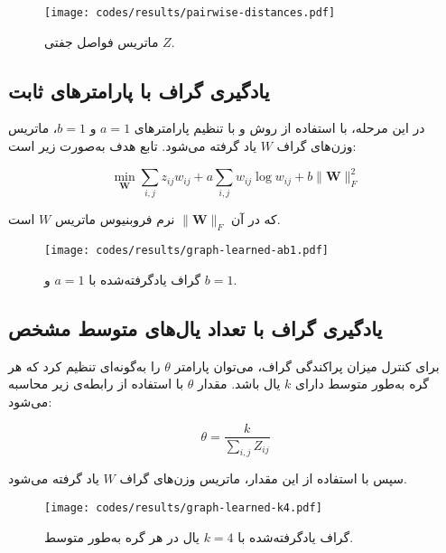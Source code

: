 \documentclass[10pt,twocolumn,a4paper]{article}
\begin{document}
	
	\begin{figure}[H]
		\centering
		\texttt{[image: codes/results/pairwise-distances.pdf]}
		\caption{ماتریس فواصل جفتی \( Z \).}
		\label{fig:pairwise-distances}
	\end{figure}
	
	\subsection{یادگیری گراف با پارامترهای ثابت}
	در این مرحله، با استفاده از روش \cite{Kalofolias2016} و با تنظیم پارامترهای \( a = 1 \) و \( b = 1 \)، ماتریس وزن‌های گراف \( W \) یاد گرفته می‌شود. تابع هدف به‌صورت زیر است:
	
	\[
	\min_{\bm{W}} \sum_{i,j} z_{ij} w_{ij} + a \sum_{i,j} {w}_{ij} \log {w}_{ij} + b \|\bm{W}\|_F^2
	\]
	
	که در آن
	 \( \|\bm{W}\|_F \)
	 نرم فروبنیوس ماتریس \( W \) است.
	
	\begin{latin}
		
	\end{latin}
	
	\begin{figure}[H]
		\centering
		\texttt{[image: codes/results/graph-learned-ab1.pdf]}
		\caption{گراف یادگرفته‌شده با \( a = 1 \) و \( b = 1 \).}
		\label{fig:graph-learned-ab1}
	\end{figure}
	
	\subsection{یادگیری گراف با تعداد یال‌های متوسط مشخص}
	برای کنترل میزان پراکندگی گراف، می‌توان پارامتر \( \theta \) را به‌گونه‌ای تنظیم کرد که هر گره به‌طور متوسط دارای \( k \) یال باشد. مقدار \( \theta \) با استفاده از رابطه‌ی زیر محاسبه می‌شود:
	
	\[
	\theta = \frac{k}{\sum_{i,j} Z_{ij}}
	\]
	
	سپس با استفاده از این مقدار، ماتریس وزن‌های گراف \( W \) یاد گرفته می‌شود.
	
	\begin{latin}
		
	\end{latin}
	
	
	\begin{figure}[H]
		\centering
		\texttt{[image: codes/results/graph-learned-k4.pdf]}
		\caption{گراف یادگرفته‌شده با \( k = 4 \) یال در هر گره به‌طور متوسط.}
		\label{fig:graph-learned-k4}
	\end{figure}
	
\end{document}
